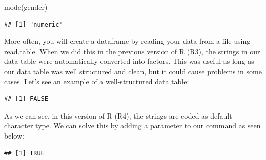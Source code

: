 \documentclass[
]{book}
\newenvironment{Shaded}{\begin{snugshade}}{\end{snugshade}}
\newcommand{\AttributeTok}[1]{\textcolor[rgb]{0.77,0.63,0.00}{#1}}
\newcommand{\ConstantTok}[1]{\textcolor[rgb]{0.00,0.00,0.00}{#1}}
\newcommand{\FunctionTok}[1]{\textcolor[rgb]{0.00,0.00,0.00}{#1}}
\newcommand{\NormalTok}[1]{#1}
\newcommand{\OtherTok}[1]{\textcolor[rgb]{0.56,0.35,0.01}{#1}}
\newcommand{\SpecialCharTok}[1]{\textcolor[rgb]{0.00,0.00,0.00}{#1}}
\newcommand{\StringTok}[1]{\textcolor[rgb]{0.31,0.60,0.02}{#1}}
\begin{document}
\begin{Shaded}
\begin{Highlighting}[]
\FunctionTok{mode}\NormalTok{(gender)}
\end{Highlighting}
\end{Shaded}

\begin{verbatim}
## [1] "numeric"
\end{verbatim}

More often, you will create a dataframe by reading your data from a file using read.table. When we did this in the previous version of R (R3), the strings in our data table were automatically converted into factors. This was useful as long as our data table was well structured and clean, but it could cause problems in some cases. Let's see an example of a well-structured data table:

\begin{Shaded}
\end{Shaded}

\begin{verbatim}
## [1] FALSE
\end{verbatim}

As we can see, in this version of R (R4), the strings are coded as default character type. We can solve this by adding a parameter to our command as seen below:

\begin{Shaded}
\end{Shaded}

\begin{verbatim}
## [1] TRUE
\end{verbatim}
\end{document}
